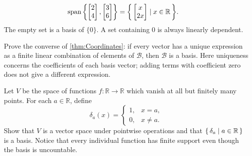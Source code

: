 \begin{Example}
\begin{align*}
\operatorname{span}\qty{\begin{bmatrix}2\\4\end{bmatrix},\begin{bmatrix}3\\6\end{bmatrix}}&=\qty{\, \begin{bmatrix}x\\2x\end{bmatrix} \mid x\in\mathbb R \,}.
\end{align*}
The empty set is a basis of $\{0\}$. A set containing $0$ is always linearly dependent.
\end{Example}

\begin{Exercise}
Prove the converse of \cref{thm:Coordinates}: if every vector has a unique expression as a finite linear combination of elements of $\mathcal B$, then $\mathcal B$ is a basis. Here uniqueness concerns the coefficients of each basis vector; adding terms with coefficient zero does not give a different expression.
\end{Exercise}

\begin{Exercise}
Let $V$ be the space of functions $f\colon\mathbb R\to\mathbb R$ which vanish at all but finitely many points. For each $a\in\mathbb R$, define
\begin{equation*}
\delta_a(x)=\begin{cases}1,&x=a,\\0,&x\ne a.\end{cases}
\end{equation*}
Show that $V$ is a vector space under pointwise operations and that $\qty{\, \delta_a \mid a\in\mathbb R \,}$ is a basis. Notice that every individual function has finite support even though the basis is uncountable.
\end{Exercise}
